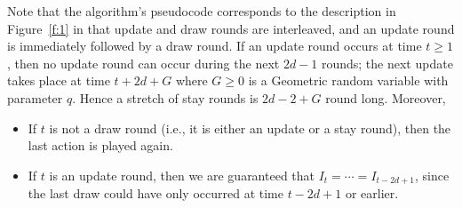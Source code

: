 %
%
Note that the algorithm's pseudocode corresponds to the description in Figure~\ref{f:1} in that update and draw rounds are interleaved,
and an update round is immediately followed by a draw round. If an update round occurs at time $t \ge 1$, then no update round
can occur during the next $2d-1$ rounds; the next update takes place at time $t+2d+G$ where $G \ge 0$ is a Geometric random variable
with parameter $q$. Hence a stretch of stay rounds is $2d-2+G$ round long.
Moreover,
\begin{itemize}[topsep=0pt,parsep=0pt,itemsep=0pt]
\item
If $t$ is not a draw round (i.e., it is either an update or a stay round), then the last action is played again.
\item
If $t$ is an update round, then we are guaranteed that $I_t=\cdots=I_{t-2d+1}$, since the last draw could have only occurred
at time $t-2d+1$ or earlier.
\end{itemize}
